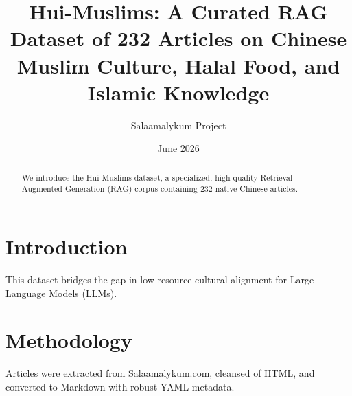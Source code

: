 \documentclass{article}
\title{Hui-Muslims: A Curated RAG Dataset of 232 Articles on Chinese Muslim Culture, Halal Food, and Islamic Knowledge}
\author{Salaamalykum Project}
\date{June 2026}
\begin{document}
\maketitle
\begin{abstract}
We introduce the Hui-Muslims dataset, a specialized, high-quality Retrieval-Augmented Generation (RAG) corpus containing 232 native Chinese articles. 
\end{abstract}
\section{Introduction}
This dataset bridges the gap in low-resource cultural alignment for Large Language Models (LLMs).
\section{Methodology}
Articles were extracted from Salaamalykum.com, cleansed of HTML, and converted to Markdown with robust YAML metadata.
\end{document}
